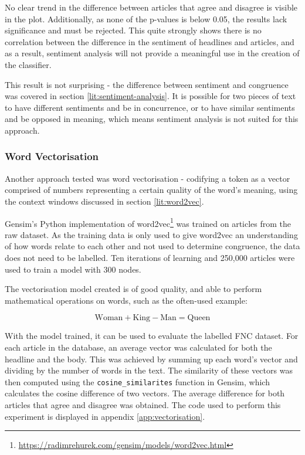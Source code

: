 No clear trend in the difference between articles that agree and disagree is visible in the plot. Additionally, as none of the p-values is below 0.05, the results lack significance and must be rejected. This quite strongly shows there is no correlation between the difference in the sentiment of headlines and articles, and as a result, sentiment analysis will not provide a meaningful use in the creation of the classifier.

This result is not surprising - the difference between sentiment and congruence was covered in section \ref{lit:sentiment-analysis}. It is possible for two pieces of text to have different sentiments and be in concurrence, or to have similar sentiments and be opposed in meaning, which means sentiment analysis is not suited for this approach.

\subsubsection{Word Vectorisation}
Another approach tested was word vectorisation - codifying a token as a vector comprised of numbers representing a certain quality of the word's meaning, using the context windows discussed in section \ref{lit:word2vec}.

Gensim's Python implementation of word2vec\footnote{\url{https://radimrehurek.com/gensim/models/word2vec.html}} was trained on articles from the raw dataset. As the training data is only used to give word2vec an understanding of how words relate to each other and not used to determine congruence, the data does not need to be labelled. Ten iterations of learning and 250,000 articles were used to train a model with 300 nodes.

The vectorisation model created is of good quality, and able to perform mathematical operations on words, such as the often-used example:

\[\textrm{Woman} + \textrm{King} - \textrm{Man} = \textrm{Queen}\]

With the model trained, it can be used to evaluate the labelled FNC dataset.
For each article in the database, an average vector was calculated for both the headline and the body. This was achieved by summing up each word's vector and dividing by the number of words in the text. The similarity of these vectors was then computed using the \texttt{cosine\_similarites} function in Gensim, which calculates the cosine difference of two vectors. The average difference for both articles that agree and disagree was obtained. The code used to perform this experiment is displayed in appendix \ref{app:vectorisation}.


